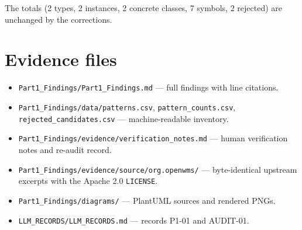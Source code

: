 \documentclass[11pt,a4paper]{article}
\newcommand{\code}[1]{\nolinkurl{#1}}
\begin{document}
The totals (2 types, 2 instances, 2 concrete classes, 7 symbols, 2 rejected) are unchanged by the corrections.

\section{Evidence files}
\begin{itemize}[nosep]
\item \code{Part1_Findings/Part1_Findings.md} --- full findings with line citations.
\item \code{Part1_Findings/data/patterns.csv}, \code{pattern_counts.csv}, \code{rejected_candidates.csv} --- machine-readable inventory.
\item \code{Part1_Findings/evidence/verification_notes.md} --- human verification notes and re-audit record.
\item \code{Part1_Findings/evidence/source/org.openwms/} --- byte-identical upstream excerpts with the Apache 2.0 \code{LICENSE}.
\item \code{Part1_Findings/diagrams/} --- PlantUML sources and rendered PNGs.
\item \code{LLM_RECORDS/LLM_RECORDS.md} --- records P1-01 and AUDIT-01.
\end{itemize}
\end{document}
